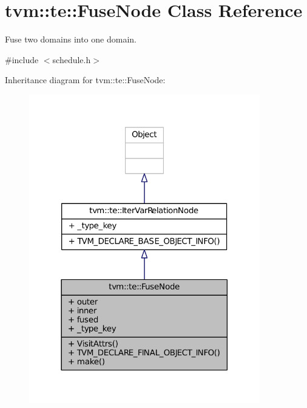 \hypertarget{classtvm_1_1te_1_1FuseNode}{}\section{tvm\+:\+:te\+:\+:Fuse\+Node Class Reference}
\label{classtvm_1_1te_1_1FuseNode}


Fuse two domains into one domain.  




{\ttfamily \#include $<$schedule.\+h$>$}



Inheritance diagram for tvm\+:\+:te\+:\+:Fuse\+Node\+:
\nopagebreak
\begin{figure}[H]
\begin{center}
\leavevmode
\includegraphics[width=285pt]{classtvm_1_1te_1_1FuseNode__inherit__graph}
\end{center}
\end{figure}



